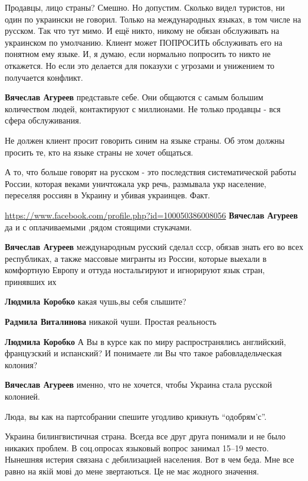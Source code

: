\begin{itemize}

Продавцы, лицо страны? Смешно. Но допустим. Сколько видел туристов, ни один по
украински не говорил. Только на международных языках, в том числе на русском.
Так что тут мимо. И ещё никто, никому не обязан обслуживать на украинском по
умолчанию. Клиент может ПОПРОСИТЬ обслуживать его на понятном ему языке. И, я
думаю, если нормально попросить то никто не откажется. Но если это делается для
показухи с угрозами и унижением то получается конфликт.

\textbf{Вячеслав Агуреев} представьте себе. Они общаются с самым большим
количеством людей, контактируют с миллионами. Не только продавцы - вся сфера
обслуживания.

Не должен клиент просит говорить синим на языке страны. Об этом должны просить
те, кто на языке страны не хочет общаться.

А то, что больше говорят на русском - это последствия систематической работы
России, которая веками уничтожала укр речь, размывала укр население, переселяя
россиян в Украину и убивая украинцев. Факт.


\url{https://www.facebook.com/profile.php?id=100050386008056}
\textbf{Вячеслав Агуреев} да и с оплачиваемыми ,рядом стоящими стукачами.

\textbf{Вячеслав Агуреев} международным русский сделал ссср, обязав знать его во всех республиках, а также массовые мигранты из России, которые выехали в комфортную Европу и оттуда ностальгируют и игнорируют язык стран, принявших их

\textbf{Людмила Коробко} какая чушь,вы себя слышите?

\textbf{Радмила Виталинова} никакой чуши. Простая реальность

\textbf{Людмила Коробко} А Вы в курсе как по миру распространялись английский, французский и испанский? И понимаете ли Вы что такое рабовладельческая колония?

\textbf{Вячеслав Агуреев} именно, что не хочется, чтобы Украина стала русской колонией.


Люда, вы как на партсобрании спешите угодливо крикнуть \enquote{одобрям'с}.

Украина билингвистичная страна. Всегда все друг друга понимали и не было
никаких проблем. В соц.опросах языковый вопрос занимал 15--19 место. Нынешняя
истерия связана с дебилизацией населения. Вот в чем беда. Мне все равно на якій
мові до мене звертаються. Це не має жодного значення.


\end{itemize}

